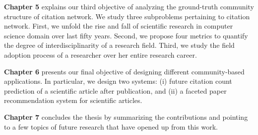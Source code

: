 {\bf Chapter 5} explains our third objective of analyzing the ground-truth community structure of citation network. We study three
subproblems pertaining  to citation network. First, we unfold the rise and fall of scientific research in computer science domain over last
fifty years. Second, we propose four metrics to quantify the degree of interdisciplinarity of a research field. Third, we study the field
adoption process of a researcher over her entire research career.

{\bf Chapter 6} presents our final objective of designing different community-based applications. In particular, we design two
systems: (i) future citation count prediction of a scientific article after publication, and (ii) a faceted paper recommendation system for
scientific articles.

{\bf Chapter 7} concludes the thesis by summarizing the contributions and pointing to a few topics of future research that have opened up from this work.

 

